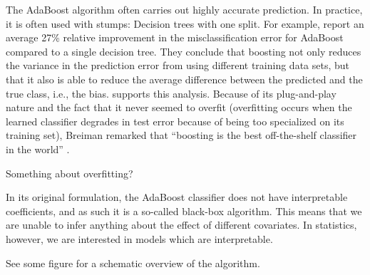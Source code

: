 The AdaBoost algorithm often carries out highly accurate prediction. In practice, it is often used with stumps: Decision trees with one split. For example, \citet{bauer-kohavi} report an average 27\% relative improvement in the misclassification error for AdaBoost compared to a single decision tree. They conclude that boosting not only reduces the variance in the prediction error from using different training data sets, but that it also is able to reduce the average difference between the predicted and the true class, i.e., the bias. \citet{breiman1998} supports this analysis. Because of its plug-and-play nature and the fact that it never seemed to overfit (overfitting occurs when the learned classifier degrades in test error because of being too specialized on its training set), Breiman remarked that ``boosting is the best off-the-shelf classifier in the world'' \citep{ESL}.

Something about overfitting?

In its original formulation, the AdaBoost classifier does not have interpretable coefficients, and as such it is a so-called black-box algorithm. This means that we are unable to infer anything about the effect of different covariates. In statistics, however, we are interested in models which are interpretable.

See some figure for a schematic overview of the algorithm.

